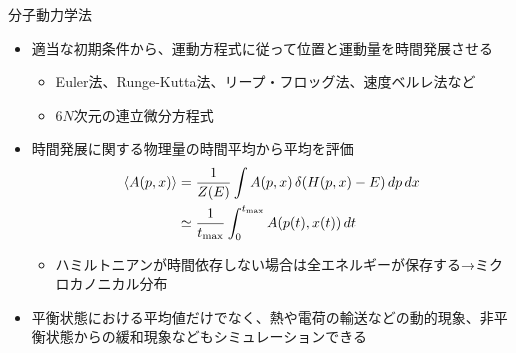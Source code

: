 
\begin{frame}[t,fragile]{分子動力学法}
  \begin{itemize}
    \setlength{\itemsep}{1em}
  \item 適当な初期条件から、運動方程式に従って位置と運動量を時間発展させる
    \begin{itemize}
    \item Euler法、Runge-Kutta法、リープ・フロッグ法、速度ベルレ法など
    \item $6N$次元の連立微分方程式
    \end{itemize}
  \item 時間発展に関する物理量の時間平均から平均を評価
    \begin{align*}
      \langle A(p,x) \rangle &= \frac{1}{Z(E)} \int A(p,x) \, \delta(H(p,x)-E) \, dp \, dx \\
      &\simeq \frac{1}{t_{\rm max}} \int_0^{t_{\rm max}} A(p(t),x(t)) \, dt
    \end{align*}
    \begin{itemize}
    \item ハミルトニアンが時間依存しない場合は全エネルギーが保存する→ミクロカノニカル分布
    \end{itemize}
  \item 平衡状態における平均値だけでなく、熱や電荷の輸送などの動的現象、非平衡状態からの緩和現象などもシミュレーションできる
  \end{itemize}
\end{frame}
